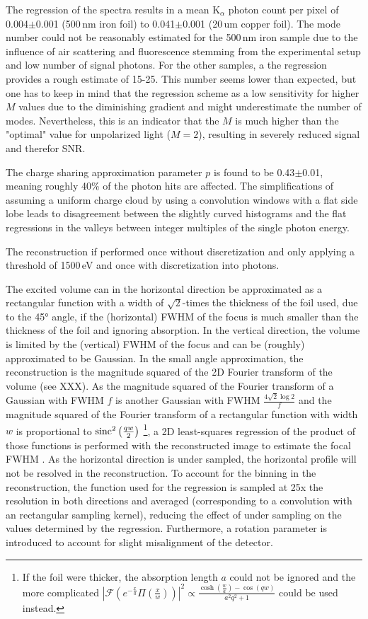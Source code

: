 The regression of the spectra results in a mean K$_{\alpha}$ photon count per pixel of 0.004$\pm$0.001 (500\,nm iron foil) to 0.041$\pm$0.001 (20\,um copper foil). The mode number could not be reasonably estimated for the 500\,nm iron sample due to the influence of air scattering and fluorescence stemming from the experimental setup and low number of signal photons. For the other samples, a the regression provides a rough estimate of 15-25. This number seems lower than expected, but one has to keep in mind that the regression scheme as a low sensitivity for higher $M$ values due to the diminishing gradient and might underestimate the number of modes. Nevertheless, this is an indicator that the $M$ is much higher than the "optimal" value for unpolarized light ($M=2$), resulting in severely reduced signal and therefor SNR.

The charge sharing approximation parameter $p$ is found to be 0.43$\pm$0.01, meaning roughly 40\% of the photon hits are affected. The simplifications of assuming a uniform charge cloud by using a convolution windows with a flat side lobe leads to disagreement between the slightly curved histograms and the flat regressions in the valleys between integer multiples of the single photon energy.

The reconstruction if performed once without discretization and only applying a threshold of 1500\,eV and once with discretization into photons. 




The excited volume can in the horizontal direction be approximated as a rectangular function with a width of $\sqrt{2}$-times the thickness of the foil used, due to the 45° angle, if the (horizontal) FWHM of the focus is much smaller than the thickness of the foil and ignoring absorption.  In the vertical direction, the volume is limited by the (vertical) FWHM of the focus and can be (roughly) approximated to be Gaussian. 
In the small angle approximation, the reconstruction is the magnitude squared of the 2D Fourier transform of the volume (see XXX). As the magnitude squared of the Fourier transform of a Gaussian with FWHM $f$ is another Gaussian with FWHM $\frac{4\sqrt{2}\log{2}}{f}$ and the magnitude squared of the Fourier transform of a rectangular function with width $w$ is proportional to $\operatorname{sinc}^2{\left(\frac{q w}{2}\right)}$
\footnote{If the foil were thicker, the absorption length $a$ could not be ignored and the more complicated $\left|\mathscr{F}\left(e^{-\frac{x}{a}} \Pi \left(\frac{x}{w}\right)\right)\right|^2 \propto \frac{\cosh \left(\frac{w}{a}\right)-\cos (q w)}{a^2 q^2+1}$
 could be used instead.}, a 2D least-squares regression of the product of those functions is performed with the reconstructed image to estimate the focal FWHM \cite{butz2015}. As the horizontal direction is under sampled, the horizontal profile will not be resolved in the reconstruction. To account for the binning in the reconstruction, the function used for the regression is sampled at 25x the resolution in both directions and averaged (corresponding to a convolution with an rectangular sampling kernel), reducing the effect of under sampling on the values determined by the regression. Furthermore, a rotation parameter is introduced to account for slight misalignment of the detector.

